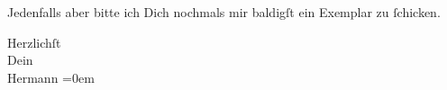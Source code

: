 \pstart
           Jedenfalls aber bitte ich Dich nochmals mir baldigſt ein Exemplar zu{ }ſchicken.\pend
           
\pstart
           Herzlichſt{\\[\baselineskip]}Dein{\\[\baselineskip]}\spacefill\mbox{Hermann}\pend
           \leftskip=0em{}\endnumbering{}  \newcommand{\dateiname}{L01283}\newcommand{\titel}{Hermann Bahr an Arthur Schnitzler, [30. 3. 1903]}\newcommand{\editorInnen}{Herausgegeben von Martin Anton Müller}
